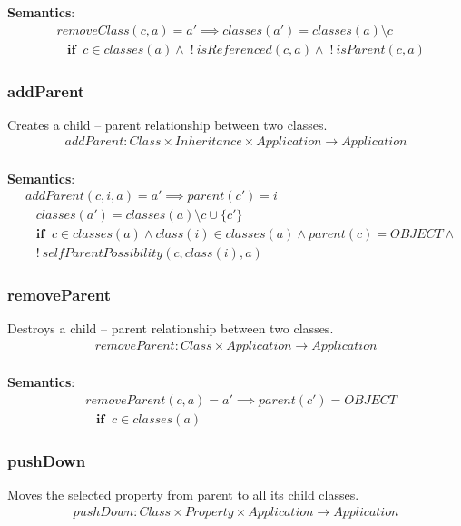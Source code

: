 \documentclass[10pt]{article}
\begin{document}
\noindent \textbf{Semantics}:
\begin{align}
& removeClass(c, a) = a' \implies  classes(a') = classes(a) \setminus c \nonumber \\
& \;\;\; \mathbf{if} \;\; c \in classes(a) \land \; ! \: isReferenced(c, a) \land \; ! \: isParent(c, a)
\end{align}

\subsubsection{addParent}
Creates a child -- parent relationship between two classes.
\begin{align}
addParent: Class \times Inheritance \times Application \rightarrow Application \\
\end{align}

\noindent \textbf{Semantics}:
\begin{align}
& addParent(c, i, a) = a' \implies parent(c') = i  \nonumber \\
& \;\;\; classes(a') = classes(a) \setminus c  \cup \{c'\} \nonumber \\
& \;\;\; \mathbf{if} \;\; c \in classes(a) \land class(i) \in classes(a) \land parent(c)= OBJECT \land \nonumber \\
& \;\;\; ! \: selfParentPossibility(c, class(i), a)
\end{align}

\subsubsection{removeParent}
Destroys a child -- parent relationship between two classes.
\begin{align}
removeParent: Class \times Application \rightarrow Application \\
\end{align}

\noindent \textbf{Semantics}:
\begin{align}
& removeParent(c, a) = a' \implies parent(c') = OBJECT \nonumber \\
& \;\;\; \mathbf{if} \;\; c \in classes(a)
\end{align}

\subsubsection{pushDown}
Moves the selected property from parent to all its child classes. 
\begin{align}
pushDown: Class \times Property \times Application \rightarrow Application
\end{align}
\end{document}
